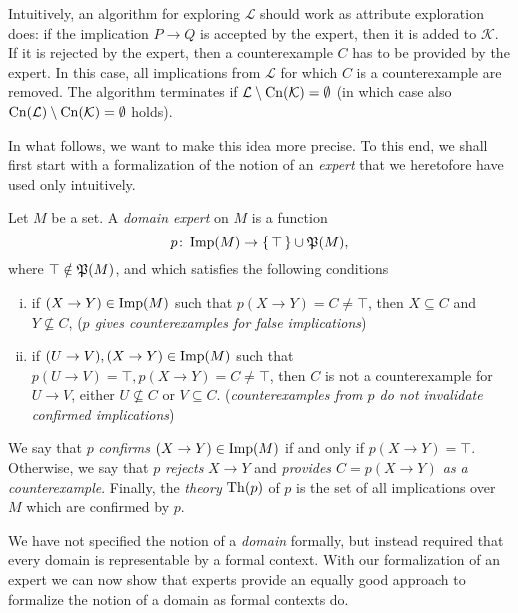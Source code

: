 Intuitively, an algorithm for exploring $\mathcal{L}$ should work as attribute exploration
does: if the implication $P \to Q$ is accepted by the expert, then it is added to
$\mathcal{K}$.  If it is rejected by the expert, then a counterexample $C$ has to be
provided by the expert.  In this case, all implications from $\mathcal{L}$ for which $C$
is a counterexample are removed.  The algorithm terminates if $\mathcal{L} \setminus
\operatorname{Cn}(\mathcal{K}) = \emptyset$ (in which case also $\operatorname{Cn}(\mathcal{L}) \setminus
\operatorname{Cn}(\mathcal{K}) = \emptyset$ holds).

In what follows, we want to make this idea more precise.  To this end, we shall first
start with a formalization of the notion of an \emph{expert} that we heretofore have used
only intuitively.

\begin{Definition}
  \label{def:domain-expert}
  Let $M$ be a set.  A \emph{domain expert} on $M$ is a function
  \begin{equation*}
    p \colon \operatorname{Imp}(M) \to {\ensuremath{\{\, \top \,\}}} \cup {\ensuremath{\mathfrak{P}(M)}},
  \end{equation*}
  where $\top \notin {\ensuremath{\mathfrak{P}(M)}}$, and which satisfies the following conditions
  \begin{enumerate}[i. ]
  \item if $(X \to Y) \in \operatorname{Imp}(M)$ such that $p(X \to Y) = C \neq \top$, then $ X
    \subseteq C$ and $Y \not\subseteq C$, (\emph{$p$ gives counterexamples for false
      implications})
  \item if $(U \to V), (X \to Y) \in \operatorname{Imp}(M)$ such that $p(U \to V) = \top, p(X \to Y) = C
    \neq \top$, then $C$ is not a counterexample for $U \to V$, \ie either $U
    \not\subseteq C$ or $V \subseteq C$. (\emph{counterexamples from $p$ do not invalidate
      confirmed implications})
  \end{enumerate}
  We say that $p$ \emph{confirms} $(X \to Y) \in \operatorname{Imp}(M)$ if and only if $p(X \to Y) =
  \top$.  Otherwise, we say that $p$ \emph{rejects} $X \to Y$ and \emph{provides $C = p(X
    \to Y)$ as a counterexample}.  Finally, the \emph{theory} $\operatorname{Th}(p)$ of $p$ is the set
  of all implications over $M$ which are confirmed by $p$.
\end{Definition}

We have not specified the notion of a \emph{domain} formally, but instead required that
every domain is representable by a formal context.  With our formalization of an expert we
can now show that experts provide an equally good approach to formalize the notion of a
domain as formal contexts do.

